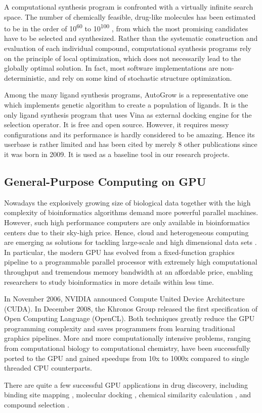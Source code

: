 A computational synthesis program is confronted with a virtually infinite search space. The number of chemically feasible, drug-like molecules has been estimated to be in the order of 10\textsuperscript{60} to 10\textsuperscript{100} \citep{363}, from which the most promising candidates have to be selected and synthesized. Rather than the systematic construction and evaluation of each individual compound, computational synthesis programs rely on the principle of local optimization, which does not necessarily lead to the globally optimal solution. In fact, most software implementations \citep{466,749} are non-deterministic, and rely on some kind of stochastic structure optimization.

Among the many ligand synthesis programs, AutoGrow \citep{466} is a representative one which implements genetic algorithm to create a population of ligands. It is the only ligand synthesis program that uses Vina \citep{595} as external docking engine for the selection operator. It is free and open source. However, it requires messy configurations and its performance is hardly considered to be amazing. Hence its userbase is rather limited and has been cited by merely 8 other publications since it was born in 2009. It is used as a baseline tool in our research projects.

\subsection{General-Purpose Computing on GPU}

Nowadays the explosively growing size of biological data together with the high complexity of bioinformatics algorithms demand more powerful parallel machines. However, such high performance computers are only available in bioinformatics centers due to their sky-high price. Hence, cloud and heterogeneous computing are emerging as solutions for tackling large-scale and high dimensional data sets \citep{269,267,268}. In particular, the modern GPU has evolved from a fixed-function graphics pipeline to a programmable parallel processor with extremely high computational throughput and tremendous memory bandwidth at an affordable price, enabling researchers to study bioinformatics in more details within less time.

In November 2006, NVIDIA announced Compute United Device Architecture (CUDA). In December 2008, the Khronos Group released the first specification of Open Computing Language (OpenCL). Both techniques greatly reduce the GPU programming complexity and saves programmers from learning traditional graphics pipelines. More and more computationally intensive problems, ranging from computational biology to computational chemistry, have been successfully ported to the GPU and gained speedups from 10x to 1000x compared to single threaded CPU counterparts.

There are quite a few successful GPU applications in drug discovery, including binding site mapping \citep{722}, molecular docking \citep{723,652,779}, chemical similarity calculation \citep{726}, and compound selection \citep{750}.

\chapterend
